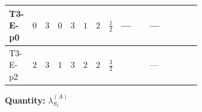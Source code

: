 \documentclass[8pt]{article}
\begin{document}
\begin{landscape}
\begin{longtable}{@{}llcccccc >{\raggedright\arraybackslash}p{0.21\linewidth} >{\raggedright\arraybackslash}p{0.21\linewidth} >{\raggedright\arraybackslash}p{0.21\linewidth}@{}}
\midrule
T3-E-p0 & $0$ & $3$ & $0$ & $3$ & $1$ & $2$ & $\frac{1}{2}$ & --- & --- & \scriptsize\adjustbox{max width=\linewidth}{$\begin{gathered} +\frac{{\lambda_{HS_1}^{(1)}}^2}{2}\end{gathered}$} \\
\midrule
T3-E-p2 & $2$ & $3$ & $1$ & $3$ & $2$ & $2$ & $\frac{3}{2}$ & \scriptsize\adjustbox{max width=\linewidth}{$\begin{gathered} +\frac{3 {g_1}^4}{2}\end{gathered}$} & --- & \scriptsize\adjustbox{max width=\linewidth}{$\begin{gathered} +\frac{{\lambda_{HS_1}^{(1)}}^2}{2}\end{gathered}$} \\
\midrule
\bottomrule
\end{longtable}
\clearpage
\noindent\textbf{Quantity: }$\lambda_{S_1}^{(A)}$\par\smallskip

\end{landscape}
\end{document}
